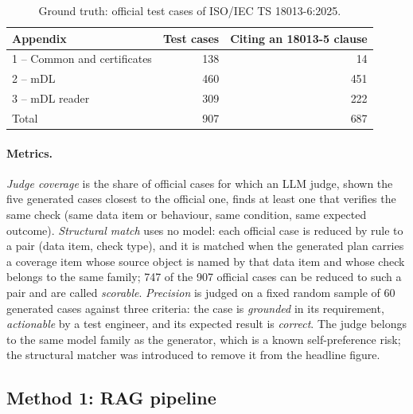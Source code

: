 \begin{table}[t]
  \centering
  \caption{Ground truth: official test cases of ISO/IEC TS 18013-6:2025.}
  \label{tab:ground-truth}
  \begin{tabular}{lrr}
    \toprule
    Appendix & Test cases & Citing an 18013-5 clause \\
    \midrule
    1 -- Common and certificates & 138 & 14 \\
    2 -- mDL                     & 460 & 451 \\
    3 -- mDL reader              & 309 & 222 \\
    \midrule
    Total                        & 907 & 687 \\
    \bottomrule
  \end{tabular}
\end{table}

\paragraph{Metrics.}
\emph{Judge coverage} is the share of official cases for which an LLM judge,
shown the five generated cases closest to the official one, finds at least one
that verifies the same check (same data item or behaviour, same condition,
same expected outcome). \emph{Structural match} uses no model: each official
case is reduced by rule to a pair (data item, check type), and it is matched
when the generated plan carries a coverage item whose source object is named
by that data item and whose check belongs to the same family; 747 of the 907
official cases can be reduced to such a pair and are called \emph{scorable}.
\emph{Precision} is judged on a fixed random sample of 60 generated cases
against three criteria: the case is \emph{grounded} in its requirement,
\emph{actionable} by a test engineer, and its expected result is
\emph{correct}. The judge belongs to the same model family as the generator,
which is a known self-preference risk; the structural matcher was introduced
to remove it from the headline figure.

\subsection{Method 1: RAG pipeline}
\label{sec:exp-rag}

